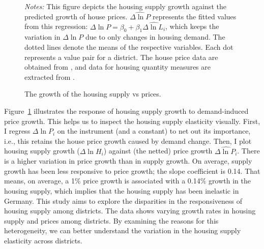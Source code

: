 \documentclass[
  12pt,
]{article}
\begin{document}
\begin{figure}


\caption{\label{fig-quantity-vs-price-netted-out}The growth of the
housing supply vs prices.}
\begin{minipage}{0.975\textwidth}
\small
\emph{Notes:} This
figure depicts the housing supply growth against the predicted growth of
house prices. \(\widehat{\Delta \ln P}\) represents the fitted values
from this regression:
\(\Delta \ln P = \beta_0 + \beta_1 \widehat{\Delta \ln L_i}\), which
keeps the variation in \(\Delta \ln P\) due to only changes in housing
demand. The dotted lines denote the means of the respective variables.
Each dot represents a value pair for a district. The house price data
are obtained from \citet{rwi_redhk_2020}, and data for housing quantity
measures are extracted from
\citet{atlasde_2022}.
\end{minipage}


\end{figure}%

Figure~\ref{fig-quantity-vs-price-netted-out} illustrates the response
of housing supply growth to demand-induced price growth. This helps us
to inspect the housing supply elasticity visually. First, I regress
\(\Delta \ln P_i\) on the instrument (and a constant) to net out its
importance, i.e., this retains the house price growth caused by demand
change. Then, I plot housing supply growth (\(\Delta\ln H_i\)) against
(the netted) price growth \(\widehat{\Delta\ln P_i}\). There is a higher
variation in price growth than in supply growth. On average, supply
growth has been less responsive to price growth; the slope coefficient
is 0.14. That means, on average, a 1\% price growth is associated with a
0.14\% growth in the housing supply, which implies that the housing
supply has been inelastic in Germany. This study aims to explore the
disparities in the responsiveness of housing supply among districts. The
data shows varying growth rates in housing supply and prices among
districts. By examining the reasons for this heterogeneity, we can
better understand the variation in the housing supply elasticity across
districts.
\end{document}
